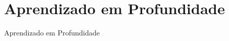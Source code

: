 \section{Aprendizado em Profundidade}
\label{s.deep_learning}

\begin{frame}{Aprendizado em Profundidade}
\end{frame}